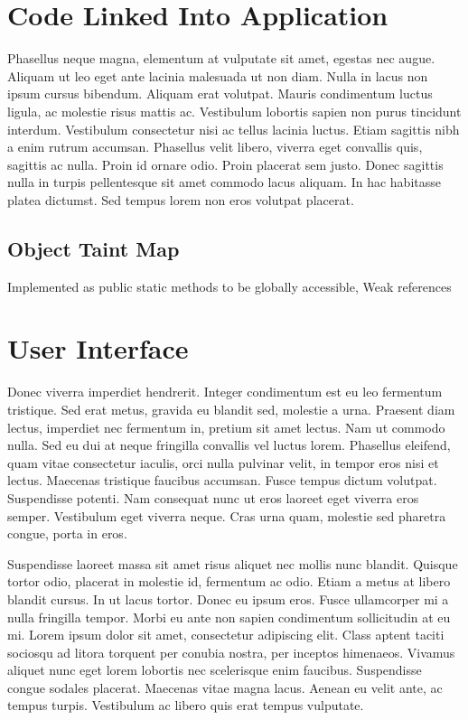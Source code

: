 \documentclass[12pt,twoside,notitlepage]{report}
\begin{document}
\section{Code Linked Into Application}

Phasellus neque magna, elementum at vulputate sit amet, egestas nec augue. Aliquam ut leo eget ante lacinia malesuada ut non diam. Nulla in lacus non ipsum cursus bibendum. Aliquam erat volutpat. Mauris condimentum luctus ligula, ac molestie risus mattis ac. Vestibulum lobortis sapien non purus tincidunt interdum. Vestibulum consectetur nisi ac tellus lacinia luctus. Etiam sagittis nibh a enim rutrum accumsan. Phasellus velit libero, viverra eget convallis quis, sagittis ac nulla. Proin id ornare odio. Proin placerat sem justo. Donec sagittis nulla in turpis pellentesque sit amet commodo lacus aliquam. In hac habitasse platea dictumst. Sed tempus lorem non eros volutpat placerat.

\subsection{Object Taint Map}

Implemented as public static methods to be globally accessible, Weak references

\section{User Interface}

Donec viverra imperdiet hendrerit. Integer condimentum est eu leo fermentum tristique. Sed erat metus, gravida eu blandit sed, molestie a urna. Praesent diam lectus, imperdiet nec fermentum in, pretium sit amet lectus. Nam ut commodo nulla. Sed eu dui at neque fringilla convallis vel luctus lorem. Phasellus eleifend, quam vitae consectetur iaculis, orci nulla pulvinar velit, in tempor eros nisi et lectus. Maecenas tristique faucibus accumsan. Fusce tempus dictum volutpat. Suspendisse potenti. Nam consequat nunc ut eros laoreet eget viverra eros semper. Vestibulum eget viverra neque. Cras urna quam, molestie sed pharetra congue, porta in eros.

Suspendisse laoreet massa sit amet risus aliquet nec mollis nunc blandit. Quisque tortor odio, placerat in molestie id, fermentum ac odio. Etiam a metus at libero blandit cursus. In ut lacus tortor. Donec eu ipsum eros. Fusce ullamcorper mi a nulla fringilla tempor. Morbi eu ante non sapien condimentum sollicitudin at eu mi. Lorem ipsum dolor sit amet, consectetur adipiscing elit. Class aptent taciti sociosqu ad litora torquent per conubia nostra, per inceptos himenaeos. Vivamus aliquet nunc eget lorem lobortis nec scelerisque enim faucibus. Suspendisse congue sodales placerat. Maecenas vitae magna lacus. Aenean eu velit ante, ac tempus turpis. Vestibulum ac libero quis erat tempus vulputate.
\end{document}
